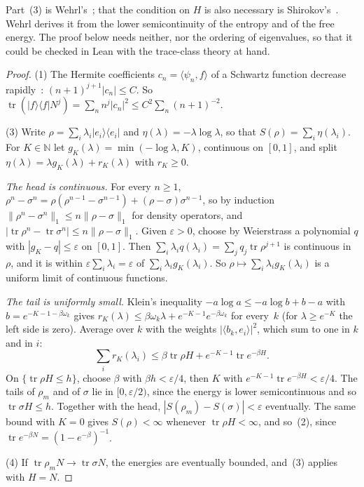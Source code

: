 \documentclass[11pt]{article}
\theoremstyle{definition}
\begin{document}
Part~(3) is Wehrl's~\cite[Sec.~II.D, p.~241]{wehrl}; that the condition on $H$ is also necessary
is Shirokov's~\cite[Prop.~1a]{shirokov}. Wehrl derives it from the lower semicontinuity of the
entropy and of the free energy. The proof below needs neither, nor the ordering of eigenvalues,
so that it could be checked in Lean with the trace-class theory at hand.

\begin{proof}
  (1) The Hermite coefficients $c_n = \langle\psi_n, f\rangle$ of a Schwartz function decrease
  rapidly~\cite{simon}: $(n+1)^{j+1}|c_n| \le C$. So
  $\operatorname{tr}(|f\rangle\langle f|N^j) = \sum_n n^j|c_n|^2 \le C^2\sum_n (n+1)^{-2}$.

  (3) Write $\rho = \sum_i \lambda_i|e_i\rangle\langle e_i|$ and $\eta(\lambda) = -\lambda\log\lambda$,
  so that $S(\rho) = \sum_i \eta(\lambda_i)$. For $K \in \mathbb N$ let
  $g_K(\lambda) = \min(-\log\lambda, K)$, continuous on $[0, 1]$, and split
  $\eta(\lambda) = \lambda g_K(\lambda) + r_K(\lambda)$ with $r_K \ge 0$.

  \emph{The head is continuous.} For every $n \ge 1$,
  $\rho^n - \sigma^n = \rho(\rho^{n-1} - \sigma^{n-1}) + (\rho - \sigma)\sigma^{n-1}$, so by
  induction $\|\rho^n - \sigma^n\|_1 \le n\|\rho - \sigma\|_1$ for density operators, and
  $|\operatorname{tr}\rho^n - \operatorname{tr}\sigma^n| \le n\|\rho - \sigma\|_1$. Given
  $\varepsilon > 0$, choose by Weierstrass a polynomial $q$ with $|g_K - q| \le \varepsilon$ on
  $[0, 1]$. Then $\sum_i\lambda_i q(\lambda_i) = \sum_j q_j\operatorname{tr}\rho^{j+1}$ is
  continuous in $\rho$, and it is within $\varepsilon\sum_i\lambda_i = \varepsilon$ of
  $\sum_i\lambda_i g_K(\lambda_i)$. So $\rho \mapsto \sum_i \lambda_i g_K(\lambda_i)$ is a
  uniform limit of continuous functions.

  \emph{The tail is uniformly small.} Klein's inequality
  $-a\log a \le -a\log b + b - a$ with $b = e^{-K-1-\beta\omega_k}$ gives
  $r_K(\lambda) \le \beta\omega_k\lambda + e^{-K-1}e^{-\beta\omega_k}$ for every~$k$ (for
  $\lambda \ge e^{-K}$ the left side is zero). Average over $k$ with the weights
  $|\langle b_k, e_i\rangle|^2$, which sum to one in $k$ and in $i$:
  \[
    \sum_i r_K(\lambda_i) \le \beta\operatorname{tr}\rho H + e^{-K-1}\operatorname{tr}e^{-\beta H}.
  \]
  On $\{\operatorname{tr}\rho H \le h\}$, choose $\beta$ with $\beta h < \varepsilon/4$, then $K$
  with $e^{-K-1}\operatorname{tr}e^{-\beta H} < \varepsilon/4$. The tails of $\rho_m$ and of
  $\sigma$ lie in $[0, \varepsilon/2)$, since the energy is lower semicontinuous and so
  $\operatorname{tr}\sigma H \le h$. Together with the head, $|S(\rho_m) - S(\sigma)| < \varepsilon$
  eventually. The same bound with $K = 0$ gives $S(\rho) < \infty$ whenever
  $\operatorname{tr}\rho H < \infty$, and so~(2), since $\operatorname{tr}e^{-\beta N} =
  (1 - e^{-\beta})^{-1}$.

  (4) If $\operatorname{tr}\rho_m N \to \operatorname{tr}\sigma N$, the energies are eventually
  bounded, and~(3) applies with $H = N$.
\end{proof}
\end{document}
